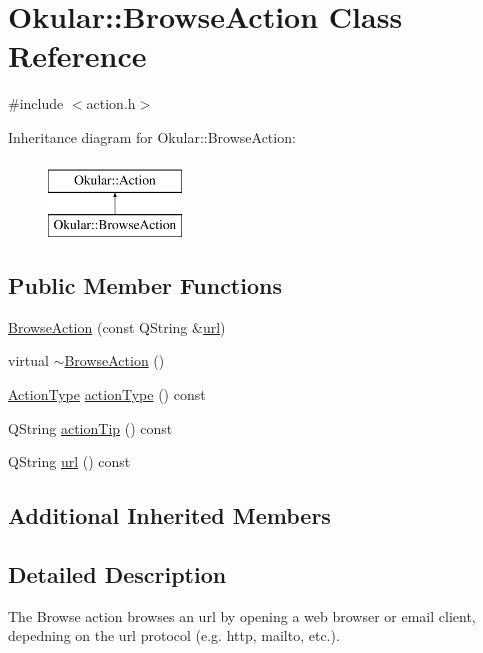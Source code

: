 \hypertarget{classOkular_1_1BrowseAction}{\section{Okular\+:\+:Browse\+Action Class Reference}
\label{classOkular_1_1BrowseAction}
}


{\ttfamily \#include $<$action.\+h$>$}

Inheritance diagram for Okular\+:\+:Browse\+Action\+:\begin{figure}[H]
\begin{center}
\leavevmode
\includegraphics[height=2.000000cm]{classOkular_1_1BrowseAction}
\end{center}
\end{figure}
\subsection*{Public Member Functions}
\begin{DoxyCompactItemize}
\item 
\hyperlink{classOkular_1_1BrowseAction_a0b61bd5c2c4a9979cafe6b2c9444c8fc}{Browse\+Action} (const Q\+String \&\hyperlink{classOkular_1_1BrowseAction_a02dfb682ec078bd783e125696bd00964}{url})
\item 
virtual \hyperlink{classOkular_1_1BrowseAction_a48f8ef6e79f836f56a11c3345bb86fc9}{$\sim$\+Browse\+Action} ()
\item 
\hyperlink{classOkular_1_1Action_abe474735af30ea76105595533df9ec47}{Action\+Type} \hyperlink{classOkular_1_1BrowseAction_a253991762e61b486d0667dc1619b0f46}{action\+Type} () const 
\item 
Q\+String \hyperlink{classOkular_1_1BrowseAction_afcc99a984ec0687a4a1f40409d344481}{action\+Tip} () const 
\item 
Q\+String \hyperlink{classOkular_1_1BrowseAction_a02dfb682ec078bd783e125696bd00964}{url} () const 
\end{DoxyCompactItemize}
\subsection*{Additional Inherited Members}


\subsection{Detailed Description}
The Browse action browses an url by opening a web browser or email client, depedning on the url protocol (e.\+g. http, mailto, etc.). 

